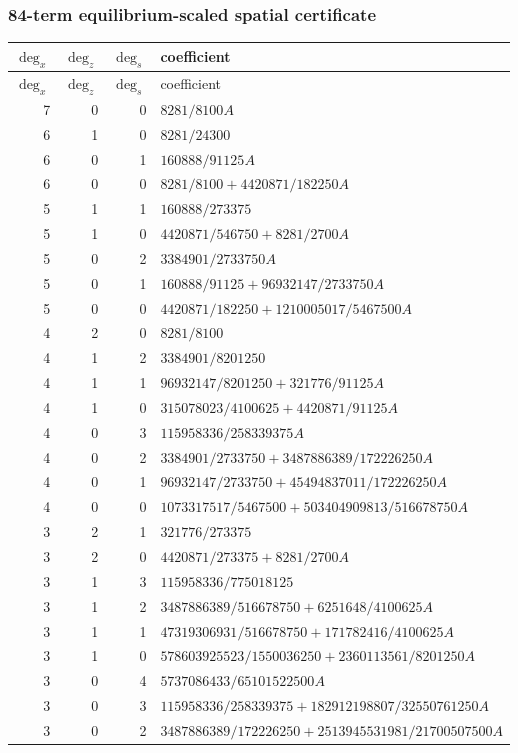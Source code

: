 \subsubsection*{84-term equilibrium-scaled spatial certificate}
\begin{longtable}{rrrl}
$\deg_{x}$ & $\deg_{z}$ & $\deg_{s}$ & coefficient\\
\toprule
\endfirsthead
$\deg_{x}$ & $\deg_{z}$ & $\deg_{s}$ & coefficient\\
\toprule
\endhead
7 & 0 & 0 & $8281/8100A$\\
6 & 1 & 0 & $8281/24300$\\
6 & 0 & 1 & $160888/91125A$\\
6 & 0 & 0 & $8281/8100+4420871/182250A$\\
5 & 1 & 1 & $160888/273375$\\
5 & 1 & 0 & $4420871/546750+8281/2700A$\\
5 & 0 & 2 & $3384901/2733750A$\\
5 & 0 & 1 & $160888/91125+96932147/2733750A$\\
5 & 0 & 0 & $4420871/182250+1210005017/5467500A$\\
4 & 2 & 0 & $8281/8100$\\
4 & 1 & 2 & $3384901/8201250$\\
4 & 1 & 1 & $96932147/8201250+321776/91125A$\\
4 & 1 & 0 & $315078023/4100625+4420871/91125A$\\
4 & 0 & 3 & $115958336/258339375A$\\
4 & 0 & 2 & $3384901/2733750+3487886389/172226250A$\\
4 & 0 & 1 & $96932147/2733750+45494837011/172226250A$\\
4 & 0 & 0 & $1073317517/5467500+503404909813/516678750A$\\
3 & 2 & 1 & $321776/273375$\\
3 & 2 & 0 & $4420871/273375+8281/2700A$\\
3 & 1 & 3 & $115958336/775018125$\\
3 & 1 & 2 & $3487886389/516678750+6251648/4100625A$\\
3 & 1 & 1 & $47319306931/516678750+171782416/4100625A$\\
3 & 1 & 0 & $578603925523/1550036250+2360113561/8201250A$\\
3 & 0 & 4 & $5737086433/65101522500A$\\
3 & 0 & 3 & $115958336/258339375+182912198807/32550761250A$\\
3 & 0 & 2 & $3487886389/172226250+2513945531981/21700507500A$\\

\end{longtable}
